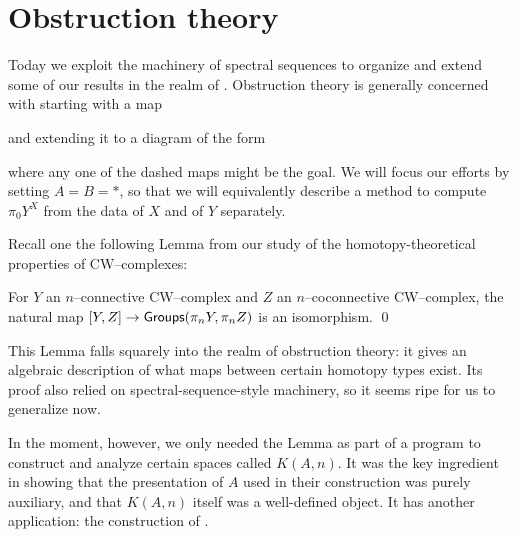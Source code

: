 \section{Obstruction theory}\label{ObstructionSection}

Today we exploit the machinery of spectral sequences to organize and extend some of our results in the realm of .
Obstruction theory is generally concerned with starting with a map
\begin{center}
\end{center}
and extending it to a diagram of the form
\begin{center}
\end{center}
where any one of the dashed maps might be the goal.
We will focus our efforts by setting $A = B = *$, so that we will equivalently describe a method to compute $\pi_0 Y^X$ from the data of $X$ and of $Y$ separately.

Recall one the following Lemma from our study of the homotopy-theoretical properties of CW--complexes:
\begin{lemma}
For $Y$ an $n$--connective CW--complex and $Z$ an $n$--coconnective CW--complex,
the natural map $[Y, Z] \to \mathsf{Groups}(\pi_n Y, \pi_n Z)$ is an isomorphism. \qed
\end{lemma}

\noindent
This Lemma falls squarely into the realm of obstruction theory: it gives an algebraic description of what maps between certain homotopy types exist.
Its proof also relied on spectral-sequence-style machinery, so it seems ripe for us to generalize now.

In the moment, however, we only needed the Lemma as part of a program to construct and analyze certain spaces called $K(A, n)$.
It was the key ingredient in showing that the presentation of $A$ used in their construction was purely auxiliary, and that $K(A, n)$ itself was a well-defined object.
It has another application: the construction of .

